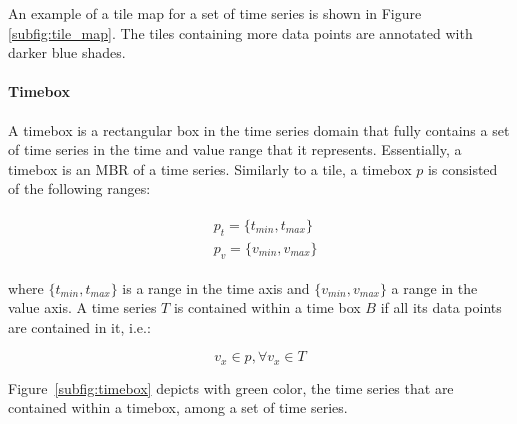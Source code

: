 \noindent An example of a tile map for a set of time series is shown in Figure \ref{subfig:tile_map}. The tiles containing more data points are annotated with darker blue shades.

\paragraph{Timebox} A timebox is a rectangular box in the time series domain that fully contains a set of time series in the time and value range that it represents. Essentially, a timebox is an MBR of a time series. Similarly to a tile, a timebox $p$ is consisted of the following ranges:

\begin{align}\label{eq:tb1}
 \begin{split}
  & p_t = \{t_{min}, t_{max}\} \\
  & p_v = \{v_{min}, v_{max}\}
 \end{split}
\end{align}

\noindent where $\{t_{min}, t_{max}\}$ is a range in the time axis and $\{v_{min}, v_{max}\}$ a range in the value axis. A time series $T$ is contained within a time box $B$ if all its data points are contained in it, i.e.:

\begin{equation} \label{eq:tb2}
v_x \in p, \forall v_x \in T
\end{equation}

Figure~\ref{subfig:timebox} depicts with green color, the time series that are contained within a timebox, among a set of time series.